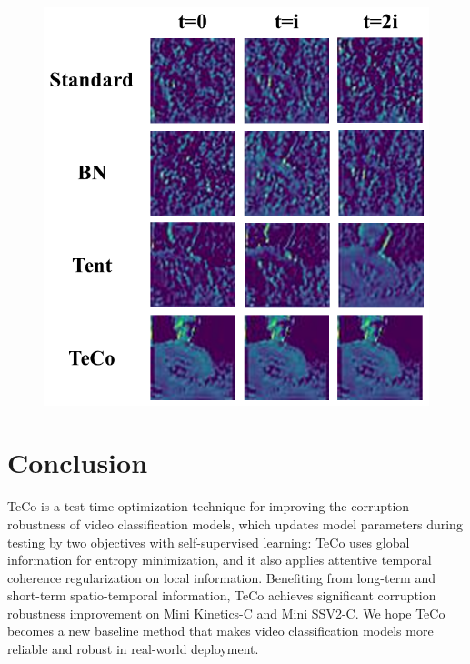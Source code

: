 \documentclass{article} %
\begin{document}
\begin{figure}[t]
\begin{minipage}{0.49\textwidth}
\label{data-fig}
\end{minipage}
\hfill
\begin{minipage}{0.48\textwidth}
\begin{center}
        \includegraphics[width=0.97\linewidth]{./images/feature_map.png}
\end{center}

\label{featuremap-fig}
\end{minipage}
\vspace{-0.5cm}
\end{figure}

\vspace{-0.3cm}
\section{Conclusion}
TeCo is a test-time optimization technique for improving the corruption robustness of video classification models, which updates model parameters during testing by two objectives with self-supervised learning:
TeCo uses global information for entropy minimization,  
and it also applies attentive temporal coherence regularization on local information. 
Benefiting from long-term and short-term spatio-temporal information, TeCo achieves significant corruption robustness improvement on Mini Kinetics-C and Mini SSV2-C. 
We hope TeCo becomes a new baseline method that makes video classification models more reliable and robust in real-world deployment.  
\end{document}
